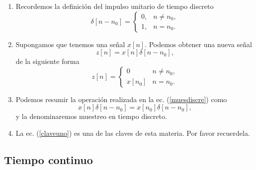 \begin{enumerate}
\item Recordemos la definici\'{o}n del impulso unitario de tiempo
  discreto
  \begin{equation}
    \delta \left[ n - n_{0}\right] =\left\{ 
      \begin{array}{ll}
        0, & n\neq n_{0}, \\ 
        1, & n = n_{0}.
      \end{array}
    \right.
  \end{equation}

\item Supongamos que tenemos una se\~{n}al $x[n]$. Podemos obtener una
  nueva se\~{n}al
  \begin{equation}
    z[n] = x[n] \delta[n - n_{0}],
  \end{equation}
  de la siguiente forma
  \begin{equation}
    z[n] = \left \{
      \begin{array}{ll}
        0       &       n \neq n_{0},   \\
        x[n_{0}]        & n  = n_{0}.
      \end{array}             \label{muesdiscre}
    \right.
  \end{equation}

\item Podemos resumir la operaci\'{o}n realizada en la ec.
  (\ref{muesdiscre}) como
  \begin{equation}
    x\left[ n\right] \delta \left[ n-n_{0}\right] =
    x\left[ n_{0}\right] \delta \left[ n-n_{0}\right], \label{claveuno}
  \end{equation}
  y la denominaremos muestreo en tiempo discreto.

\item La ec. (\ref{claveuno}) es una de las claves de esta materia.
  Por favor recuerdela.
\end{enumerate}

\subsection{Tiempo continuo}

